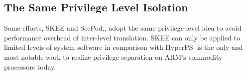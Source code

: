 \documentclass[conference]{IEEEtran}
\begin{document}
\subsection{The Same Privilege Level Isolation}
Some efforts, 
 SKEE\cite{Azab2016SKEE} and SecPod\cite{Wang2015SecPod},\cite{Deng2017Dancing}, adopt the same privilege-level idea to avoid performance overhead of inter-level translation.
SKEE can only be applied to limited levels of system software in comparison with HyperPS.
is the only and most notable work to
realize privilege separation on ARM’s commodity processors
today. 
\end{document}
